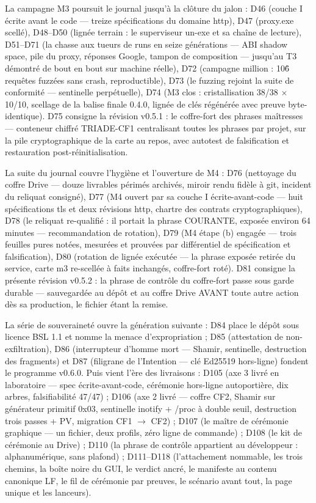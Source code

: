 La campagne M3 poursuit le journal jusqu'à la clôture du jalon : D46 (couche I écrite
avant le code — treize spécifications du domaine http), D47 (proxy.exe scellé),
D48–D50 (lignée terrain : le superviseur un-exe et sa chaîne de lecture), D51–D71 (la
chasse aux tueurs de runs en seize générations — ABI shadow space, pile du proxy,
réponses Google, tampon de composition — jusqu'au T3 démontré de bout en bout sur
machine réelle), D72 (campagne million : 10\^6 requêtes fuzzées sans crash, reproductible),
D73 (le fuzzing rejoint la suite de conformité — sentinelle perpétuelle), D74 (M3 clos :
cristallisation 38/38 $\times$ 10/10, scellage de la balise finale 0.4.0, lignée de clés
régénérée avec preuve byte-identique). D75 consigne la révision v0.5.1 : le
coffre-fort des phrases maîtresses — conteneur chiffré TRIADE-CF1 centralisant toutes
les phrases par projet, sur la pile cryptographique de la carte au repos, avec autotest
de falsification et restauration post-réinitialisation.

La suite du journal couvre l'hygiène et l'ouverture de M4 : D76 (nettoyage du coffre
Drive — douze livrables périmés archivés, miroir rendu fidèle à git, incident du reliquat
consigné), D77 (M4 ouvert par sa couche I écrite-avant-code — huit spécifications
tls et deux révisions http, chartre des contrats cryptographiques), D78 (le reliquat
re-qualifié : il portait la phrase COURANTE, exposée environ 64 minutes — recommandation
de rotation), D79 (M4 étape (b) engagée — trois feuilles pures notées, mesurées et
prouvées par différentiel de spécification et falsification), D80 (rotation de lignée
exécutée — la phrase exposée retirée du service, carte m3 re-scellée à faits inchangés,
coffre-fort roté). D81 consigne la présente révision v0.5.2 : la phrase de contrôle du
coffre-fort passe sous garde durable — sauvegardée au dépôt et au coffre Drive AVANT
toute autre action dès sa production, le fichier étant la remise.

La série de souveraineté ouvre la génération suivante : D84 place le dépôt sous licence
BSL 1.1 et nomme la menace d'expropriation ; D85 (attestation de non-exfiltration), D86
(interrupteur d'homme mort — Shamir, sentinelle, destruction des fragments) et D87
(filigrane de l'Intention — clé Ed25519 hors-ligne) fondent le programme v0.6.0. Puis
vient l'ère des livraisons : D105 (axe 3 livré en laboratoire — spec écrite-avant-code,
cérémonie hors-ligne autoportière, dix arbres, falsifiabilité 47/47) ; D106 (axe 2 livré
— coffre CF2, Shamir sur générateur primitif 0x03, sentinelle inotify + /proc à double
seuil, destruction trois passes + PV, migration CF1 $\to$ CF2) ; D107 (le maître de
cérémonie graphique — un fichier, deux profils, zéro ligne de commande) ; D108 (le kit
de cérémonie au Drive) ; D110 (la phrase de contrôle appartient au développeur :
alphanumérique, sans plafond) ; D111--D118 (l'attachement nommable, les trois chemins,
la boîte noire du GUI, le verdict ancré, le manifeste au contenu canonique LF, le fil
de cérémonie par preuves, le scénario avant tout, la page unique et les lanceurs).

